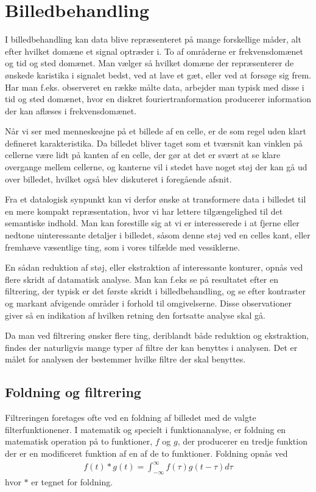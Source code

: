 \thispagestyle{plain}
\section{Billedbehandling}
\pagestyle{headings}
I billedbehandling kan data blive repræsenteret på mange forskellige måder, alt efter hvilket domæne et signal optræder i. To af områderne er frekvensdomænet og tid og sted domænet\cite{dsp}. Man vælger så hvilket domæne der repræsenterer de ønskede karistika i signalet bedst, ved at lave et gæt, eller ved at forsøge sig frem. Har man f.eks. observeret en række målte data, arbejder man typisk med disse i tid og sted domænet, hvor en diskret fouriertranformation producerer information der kan aflæses i frekvensdomænet. 

Når vi ser med menneskeøjne på et billede af en celle, er de som regel uden klart defineret karakteristika. Da billedet bliver taget som et tværsnit kan vinklen på cellerne være lidt på kanten af en celle, der gør at det er svært at se klare overgange mellem cellerne, og kanterne vil i stedet have noget støj der kan gå ud over billedet, hvilket også blev diskuteret i foregående afsnit.

Fra et datalogisk synpunkt kan vi derfor ønske at transformere data i billedet til en mere kompakt repræsentation, hvor vi har lettere tilgængelighed til det semantiske indhold. Man kan forestille sig at vi er interesserede i at fjerne eller nedtone uinteressante detaljer i billedet, såsom denne støj ved en celles kant, eller fremhæve væsentlige ting, som i vores tilfælde med vessiklerne. 

En sådan reduktion af støj, eller ekstraktion af interessante konturer, opnås ved flere skridt af datamatisk analyse. Man kan f.eks se på resultatet efter en filtrering, der typisk er det første skridt i billedbehandling, og se efter kontraster og markant afvigende områder i forhold til omgivelserne. Disse observationer giver så en indikation af hvilken retning den fortsatte analyse skal gå.

Da man ved filtrering ønsker flere ting, deriblandt både reduktion og ekstraktion, findes der naturligvis mange typer af filtre der kan benyttes i analysen. Det er målet for analysen der bestemmer hvilke filtre der skal benyttes\cite{soren}. 

\subsection{Foldning og filtrering}
Filtreringen foretages ofte ved en foldning af billedet med de valgte filterfunktionener. I matematik og specielt i funktionanalyse, er foldning en matematisk operation på to funktioner, $f$ og $g$, der producerer en tredje funktion der er en modificeret funktion af en af de to funktioner. Foldning opnås ved
\begin{align}
	f(t)*g(t)=\int_{-\infty}^{\infty}f(\tau)g(t-\tau)d\tau
\end{align}
hvor $*$ er tegnet for foldning. 

